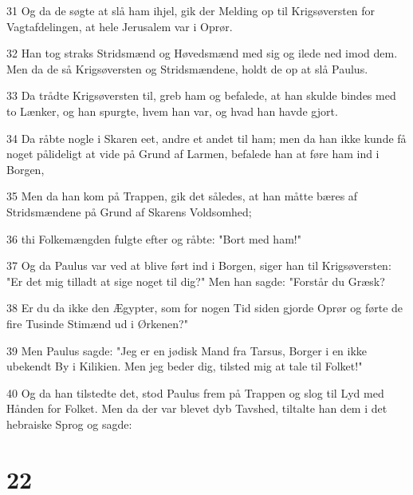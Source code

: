 \par 31 Og da de søgte at slå ham ihjel, gik der Melding op til Krigsøversten for Vagtafdelingen, at hele Jerusalem var i Oprør.
\par 32 Han tog straks Stridsmænd og Høvedsmænd med sig og ilede ned imod dem. Men da de så Krigsøversten og Stridsmændene, holdt de op at slå Paulus.
\par 33 Da trådte Krigsøversten til, greb ham og befalede, at han skulde bindes med to Lænker, og han spurgte, hvem han var, og hvad han havde gjort.
\par 34 Da råbte nogle i Skaren eet, andre et andet til ham; men da han ikke kunde få noget pålideligt at vide på Grund af Larmen, befalede han at føre ham ind i Borgen,
\par 35 Men da han kom på Trappen, gik det således, at han måtte bæres af Stridsmændene på Grund af Skarens Voldsomhed;
\par 36 thi Folkemængden fulgte efter og råbte: "Bort med ham!"
\par 37 Og da Paulus var ved at blive ført ind i Borgen, siger han til Krigsøversten: "Er det mig tilladt at sige noget til dig?" Men han sagde: "Forstår du Græsk?
\par 38 Er du da ikke den Ægypter, som for nogen Tid siden gjorde Oprør og førte de fire Tusinde Stimænd ud i Ørkenen?"
\par 39 Men Paulus sagde: "Jeg er en jødisk Mand fra Tarsus, Borger i en ikke ubekendt By i Kilikien. Men jeg beder dig, tilsted mig at tale til Folket!"
\par 40 Og da han tilstedte det, stod Paulus frem på Trappen og slog til Lyd med Hånden for Folket. Men da der var blevet dyb Tavshed, tiltalte han dem i det hebraiske Sprog og sagde:

\chapter{22}

